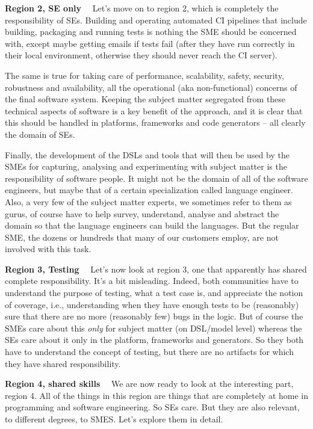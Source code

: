 \documentclass[runningheads]{llncs}
\newcommand\parhead[1]{\vspace{1mm}\noindent\textbf{{#1}}\ \ }
\begin{document}
\parhead{Region 2, SE only} Let's move on to region 2, which is completely the
responsibility of SEs.
Building and operating automated CI pipelines that include building, packaging
and running tests is nothing the SME should be concerned with, except maybe
getting emails if tests fail (after they have run correctly in their local
environment, otherwise they should never reach the CI server).
 
The same is true for taking care of performance, scalability, 
safety, security, robustness and availability, all the operational
(aka non-functional) concerns of the final software system. Keeping the
subject matter segregated from these technical aspects of software is
a key benefit of the approach, and it is clear that this should be 
handled in platforms, frameworks and code generators -- all clearly
the domain of SEs.

Finally, the development of the DSLs and tools that will then be used
by the SMEs for capturing, analysing and experimenting with subject matter
is the responsibility of software people. It might not be the domain of
all of the software engineers, but maybe that of a certain specialization
called language engineer. Also, a very few of the subject matter experts,
we sometimes refer to them as gurus, of course have to help survey,
understand, analyse and abstract the domain so that the language engineers
can build the languages. But the regular SME, the dozens or hundreds
that many of our customers employ, are not involved with this task.

\parhead{Region 3, Testing} Let's now look at region 3, one that apparently has
shared complete responsibility. It's a bit misleading. Indeed, both communities
have to understand the purpose of testing, what a test case is, and appreciate
the notion of coverage, i.e., understanding when they have enough tests to be
(reasonably) sure that there are no more (reasonably few) bugs in the logic. But
of course the SMEs care about this \emph{only} for subject matter (on DSL/model
level) whereas the SEs care about it only in the platform, frameworks and
generators. So they both have to understand the concept of testing, but there
are no artifacts for which they have shared responsibility.

\parhead{Region 4, shared skills} We are now ready to look at the interesting
part, region 4. All of the things in this region are things that are completely
at home in programming and software engineering. So SEs care. But they are also
relevant, to different degrees, to SMES. Let's explore them in detail.
\end{document}
